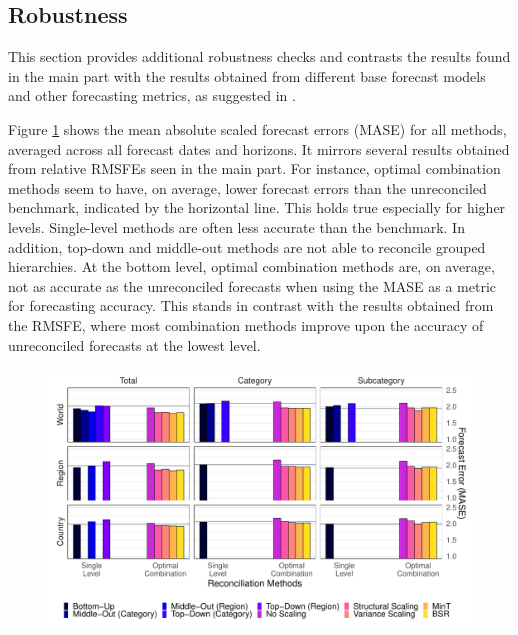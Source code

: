 \clearpage



\subsection{Robustness}
\label{sec:robust}

This section provides additional robustness checks and contrasts the results found in the main part with the results obtained from different base forecast models and other forecasting metrics, as suggested in \cite{Hyndman2006}.

Figure \ref{fig:mase} shows the mean absolute scaled forecast errors (MASE) for all methods, averaged across all forecast dates and horizons. It mirrors several results obtained from relative RMSFEs seen in the main part. For instance, optimal combination methods seem to have, on average, lower forecast errors than the unreconciled benchmark, indicated by the horizontal line. This holds true especially for higher levels. Single-level methods are often less accurate than the benchmark. In addition, top-down and middle-out methods are not able to reconcile grouped hierarchies. At the bottom level, optimal combination methods are, on average, not as accurate as the unreconciled forecasts when using the MASE as a metric for forecasting accuracy. This stands in contrast with the results obtained from the RMSFE, where most combination methods improve upon the accuracy of unreconciled forecasts at the lowest level.

\begin{figure}[H]
	\includegraphics[width=\textwidth]{fig/fig_eval_mase}
	\label{fig:mase}
\end{figure}


